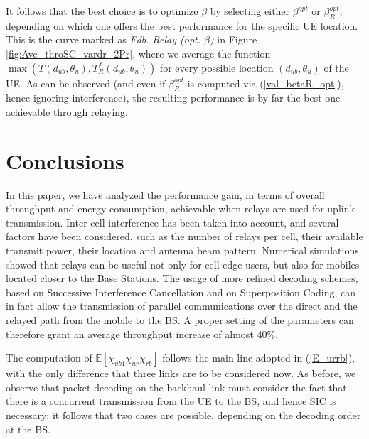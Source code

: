 \documentclass[12pt, letterpaper, onecolumn, draftcls]{IEEEtran}
\begin{document}
It follows that the best choice is to optimize $\beta$ by selecting either $\beta^{opt}$ or $\beta_R^{opt}$, depending on which one offers the best performance for the specific UE location. This is the curve marked as \textit{Fdb. Relay (opt. $\beta$)} in Figure \ref{fig:Ave_throSC_vardr_2Pr}, where we average the function $\max(T(d_{ub},\theta_u), T_R^f(d_{ub},\theta_u))$ for every possible location $(d_{ub},\theta_u)$ of the UE. As can be observed (and even if $\beta_R^{opt}$ is computed via (\ref{val_betaR_opt}), hence ignoring interference), the resulting performance is by far the best one achievable through relaying.

\section{Conclusions}
\label{concl}
In this paper, we have analyzed the performance gain, in terms of overall throughput and energy consumption, achievable when relays are used for uplink transmission. Inter-cell interference has been taken into account, and several factors have been considered, such as the number of relays per cell, their available transmit power, their location and antenna beam pattern. Numerical simulations showed that relays can be useful not only for cell-edge users, but also for mobiles located closer to the Base Stations.
The usage of more refined decoding schemes, based on Successive Interference Cancellation and on Superposition Coding, can in fact allow the transmission of parallel communications over the direct and the relayed path from the mobile to the BS. A proper setting of the parameters can therefore grant an average throughput increase of almost 40\%.

\appendix


The computation of $\mathbb{E}\left[\chi_{ub1}\chi_{ur}\chi_{rb}\right]$ follows the main line adopted in (\ref{E_urrb}), with the only difference that three links are to be considered now. As before, we observe that packet decoding on the backhaul link must consider the fact that there is a concurrent transmission from the UE to the BS, and hence SIC is necessary; it follows that two cases are possible, depending on the decoding order at the BS.
\end{document}
